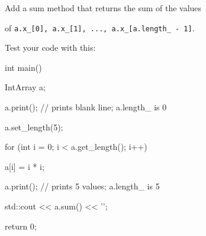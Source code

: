 Add a sum method that returns the sum of the values

of \texttt{a.x\_[0], a.x\_[1], ..., a.x\_[a.length\_ - 1]}.

Test your code with this:



\begin{consolethree}[escapeinside=||]

int main()

{

    IntArray a;

     a.print(); // prints blank line; a.length_ is 0

     a.set_length(5);

     for (int i = 0; i < a.get_length(); i++)

     {

          a[i] = i * i;

     }

     a.print(); // prints 5 values; a.length_ is 5

     std::cout << a.sum() << '\n';

     return 0;

}

\end{consolethree}

